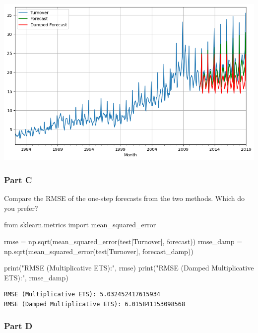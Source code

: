 \documentclass[
  11pt,
]{article}
\newenvironment{Shaded}{\begin{snugshade}}{\end{snugshade}}
\newcommand{\BuiltInTok}[1]{\textcolor[rgb]{0.00,0.23,0.31}{#1}}
\newcommand{\ImportTok}[1]{\textcolor[rgb]{0.00,0.46,0.62}{#1}}
\newcommand{\NormalTok}[1]{\textcolor[rgb]{0.00,0.23,0.31}{#1}}
\newcommand{\OperatorTok}[1]{\textcolor[rgb]{0.37,0.37,0.37}{#1}}
\newcommand{\StringTok}[1]{\textcolor[rgb]{0.13,0.47,0.30}{#1}}
\begin{document}
\includegraphics{hw5_files/figure-pdf/cell-50-output-1.png}

\subsubsection{Part C}\label{part-c-1}

Compare the RMSE of the one-step forecasts from the two methods. Which
do you prefer?

\begin{Shaded}
\begin{Highlighting}[]
\ImportTok{from}\NormalTok{ sklearn.metrics }\ImportTok{import}\NormalTok{ mean\_squared\_error}


\NormalTok{rmse }\OperatorTok{=}\NormalTok{ np.sqrt(mean\_squared\_error(test[}\StringTok{\textquotesingle{}Turnover\textquotesingle{}}\NormalTok{], forecast))}
\NormalTok{rmse\_damp }\OperatorTok{=}\NormalTok{ np.sqrt(mean\_squared\_error(test[}\StringTok{\textquotesingle{}Turnover\textquotesingle{}}\NormalTok{], forecast\_damp))}

\BuiltInTok{print}\NormalTok{(}\StringTok{"RMSE (Multiplicative ETS):"}\NormalTok{, rmse)}
\BuiltInTok{print}\NormalTok{(}\StringTok{"RMSE (Damped Multiplicative ETS):"}\NormalTok{, rmse\_damp)}
\end{Highlighting}
\end{Shaded}

\begin{verbatim}
RMSE (Multiplicative ETS): 5.032452417615934
RMSE (Damped Multiplicative ETS): 6.015841153098568
\end{verbatim}

\subsubsection{Part D}\label{part-d-1}
\end{document}
